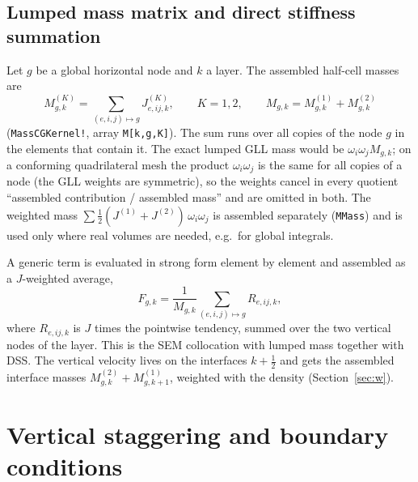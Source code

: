\documentclass[11pt,a4paper]{article}
\newcommand{\code}[1]{\texttt{#1}}
\begin{document}
\subsection{Lumped mass matrix and direct stiffness summation}

Let $g$ be a global horizontal node and $k$ a layer. The assembled half-cell
masses are
\begin{equation}
  M^{(K)}_{g,k} = \sum_{(e,i,j)\mapsto g} J^{(K)}_{e,ij,k}, \qquad K=1,2,
  \qquad M_{g,k} = M^{(1)}_{g,k} + M^{(2)}_{g,k}
\end{equation}
(\code{MassCGKernel!}, array \code{M[k,g,K]}). The sum runs over all copies of
the node $g$ in the elements that contain it. The exact lumped GLL mass would
be $\omega_i\omega_j M_{g,k}$; on a conforming quadrilateral mesh the product
$\omega_i\omega_j$ is the same for all copies of a node (the GLL weights are
symmetric), so the weights cancel in every quotient
``assembled contribution / assembled mass'' and are omitted in both. The
weighted mass $\sum\tfrac12(J^{(1)}+J^{(2)})\,\omega_i\omega_j$ is assembled
separately (\code{MMass}) and is used only where real volumes are needed,
e.g.\ for global integrals.

A generic term is evaluated in strong form element by element and assembled
as a $J$-weighted average,
\begin{equation}
  F_{g,k} = \frac{1}{M_{g,k}} \sum_{(e,i,j)\mapsto g} R_{e,ij,k},
  \label{eq:dss}
\end{equation}
where $R_{e,ij,k}$ is $J$ times the pointwise tendency, summed over the two
vertical nodes of the layer. This is the SEM collocation with lumped mass
together with DSS.
The vertical velocity lives on the interfaces $k+\tfrac12$ and gets the
assembled interface masses $M^{(2)}_{g,k}+M^{(1)}_{g,k+1}$, weighted with the
density (Section~\ref{sec:w}).

\section{Vertical staggering and boundary conditions}
\end{document}
